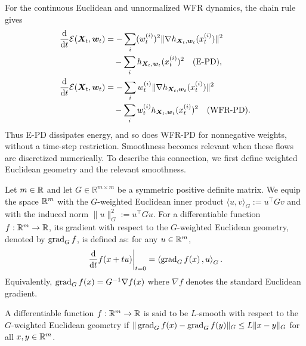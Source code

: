 For the continuous Euclidean and unnormalized WFR dynamics, the chain rule gives
\begin{align*}
\frac{\mathrm{d}}{\mathrm{d} t}\mathcal{E}(\bm{X}_t,\bm{w}_t)
&=-\sum_i(w_t^{(i)})^2\|\nabla h_{\bm{X}_t,\bm{w}_t}(x_t^{(i)})\|^2 \\
&\quad-\sum_i h_{\bm{X}_t,\bm{w}_t}(x_t^{(i)})^2
\quad\text{(E-PD)}, \\
\frac{\mathrm{d}}{\mathrm{d} t}\mathcal{E}(\bm{X}_t,\bm{w}_t)
&=-\sum_iw_t^{(i)}\|\nabla h_{\bm{X}_t,\bm{w}_t}(x_t^{(i)})\|^2 \\
&\quad-\sum_iw_t^{(i)}h_{\bm{X}_t,\bm{w}_t}(x_t^{(i)})^2
\quad\text{(WFR-PD)}.
\end{align*}
Thus E-PD dissipates energy, and so does WFR-PD for nonnegative weights, without a time-step restriction. Smoothness becomes relevant when these flows are discretized numerically. To describe this connection, we first define weighted Euclidean geometry and the relevant smoothness.

\begin{defi}\label{defi:weighted_euc}
Let $m\in\mathbb{R}$ and let $G \in \mathbb{R}^{m\times m}$ be a symmetric positive definite matrix. 
We equip the space $\mathbb{R}^m$ with the $G$-weighted Euclidean inner product $\langle u,v\rangle_G := u^\top G v$ and with the induced norm $\|u\|_G^2 := u^\top G u$. 
For a differentiable function $f:\mathbb{R}^m\to\mathbb{R}$, its gradient with respect to the $G$-weighted Euclidean geometry, denoted by $\operatorname{grad}_G f$, is defined as: for any $u\in\mathbb{R}^m$, 
\begin{align*}
    \left.\frac{\mathrm{d}}{\mathrm{d} t} f(x+t u)\right|_{t=0} = \left\langle \operatorname{grad}_G f(x)\, , u \right\rangle_G. 
\end{align*}
Equivalently, $\operatorname{grad}_G f(x) = G^{-1}\nabla f(x)$ where $\nabla f$ denotes the standard Euclidean gradient. 
\end{defi}


\begin{defi}[Smoothness]
    A differentiable function $f:\mathbb{R}^m\to\mathbb{R}$ is said to be $L$-smooth with respect to the $G$-weighted Euclidean geometry if $\|\operatorname{grad}_G f(x)-\operatorname{grad}_G f(y)\|_G
    \leq L\|x-y\|_G$ for all $x,y\in\mathbb{R}^m$. 
\end{defi}

